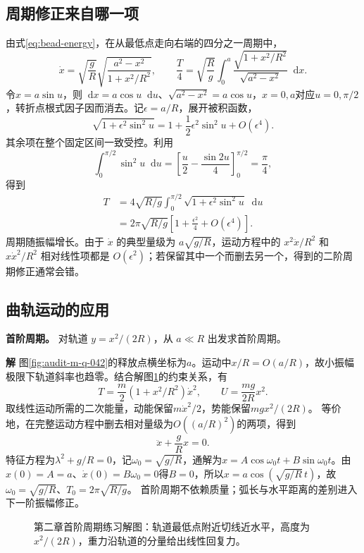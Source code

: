 \documentclass[11pt,openany,fontset=fandol]{ctexbook}
\theoremstyle{plain}\newtheorem{theorem}{定理}[chapter]\newtheorem{proposition}[theorem]{命题}
\theoremstyle{definition}\newtheorem{definition}{定义}[chapter]\newtheorem{example}{例}[chapter]
\theoremstyle{remark}\newtheorem*{remark}{说明}
\newcommand{\SolutionStart}{\par\nobreak\medskip\nobreak\noindent\textbf{解}\quad\ignorespaces}
\newenvironment{solution}{\SolutionStart}{\par\medskip}
\newcommand{\dd}{\mathop{}\!\mathrm d}\newcommand{\ii}{\mathrm i}\newcommand{\ee}{\mathrm e}
\begin{document}
\subsection{周期修正来自哪一项}
由式\eqref{eq:bead-energy}，在从最低点走向右端的四分之一周期中，
\[
\dot x=\sqrt{\frac gR}\sqrt{\frac{a^2-x^2}{1+x^2/R^2}},\qquad
\frac T4=\sqrt{\frac Rg}\int_0^a\frac{\sqrt{1+x^2/R^2}}{\sqrt{a^2-x^2}}\dd x.
\]
令$x=a\sin u$，则$\dd x=a\cos u\dd u$、$\sqrt{a^2-x^2}=a\cos u$，$x=0,a$对应$u=0,\pi/2$，转折点根式因子因而消去。记$\epsilon=a/R$，展开被积函数，
\[\sqrt{1+\epsilon^2\sin^2u}
=1+\frac12\epsilon^2\sin^2u+O(\epsilon^4).\]
其余项在整个固定区间一致受控。利用
\[\int_0^{\pi/2}\sin^2u\dd u
=\left[\frac u2-\frac{\sin2u}{4}\right]_0^{\pi/2}=\frac\pi4,\]
得到
\begin{align}
T&=4\sqrt{R/g}\int_0^{\pi/2}\sqrt{1+\epsilon^2\sin^2u}\dd u\\
&=2\pi\sqrt{R/g}\left[1+\frac{\epsilon^2}{4}+O(\epsilon^4)\right].
\end{align}
周期随振幅增长。由于 $\dot x$ 的典型量级为 $a\sqrt{g/R}$，运动方程中的 $x^2\ddot x/R^2$ 和 $x\dot x^2/R^2$ 相对线性项都是 $O(\epsilon^2)$；若保留其中一个而删去另一个，得到的二阶周期修正通常会错。

\subsection{曲轨运动的应用}
\textbf{首阶周期。} 对轨道 $y=x^2/(2R)$，从 $a\ll R$ 出发求首阶周期。


\begin{solution}
图\ref{fig:audit-m-q-042}的释放点横坐标为$a$。运动中$x/R=O(a/R)$，故小振幅极限下轨道斜率也趋零。结合解图\ref{fig:class-2-1}的约束关系，有
\[
 T=\frac m2(1+x^2/R^2)\dot x^2,\qquad U=\frac{mg}{2R}x^2.
\]
取线性运动所需的二次能量，动能保留$m\dot x^2/2$，势能保留$mgx^2/(2R)$。
等价地，在完整运动方程中删去相对量级为$O((a/R)^2)$的两项，得到
\[
 \ddot x+\frac gR x=0.
\]
特征方程为$\lambda^2+g/R=0$，记$\omega_0=\sqrt{g/R}$，通解为$x=A\cos\omega_0t+B\sin\omega_0t$。由$x(0)=A=a$、$\dot x(0)=B\omega_0=0$得$B=0$，所以$x=a\cos(\sqrt{g/R}\,t)$，故
$\omega_0=\sqrt{g/R}$、$T_0=2\pi\sqrt{R/g}$。
首阶周期不依赖质量；弧长与水平距离的差别进入下一阶振幅修正。

\begin{figure}[H]\centering
{}
\caption{第二章首阶周期练习解图：轨道最低点附近切线近水平，高度为 $x^2/(2R)$，重力沿轨道的分量给出线性回复力。}
\label{fig:class-2-1}
\end{figure}
\end{solution}
\end{document}
